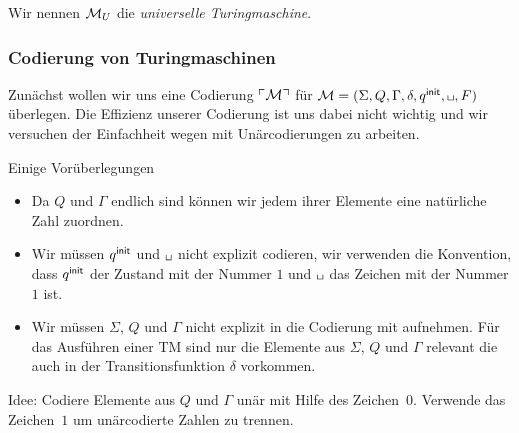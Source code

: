 Wir nennen $\mathcal{M}_U$ die \emph{universelle Turingmaschine}.

\subsubsection{Codierung von Turingmaschinen}

Zunächst wollen wir uns eine Codierung $\ulcorner \mathcal{M} \urcorner$ für $\mathcal{\M}=(\Sigma, Q, \Gamma, \delta, \qinit, \blank, F)$ überlegen.
Die Effizienz unserer Codierung ist uns dabei nicht wichtig und wir versuchen der Einfachheit wegen mit Unärcodierungen zu arbeiten.

Einige Vorüberlegungen
\begin{itemize}
 \item Da $Q$ und $\Gamma$ endlich sind können wir jedem ihrer Elemente eine natürliche Zahl zuordnen.
 \item Wir müssen $q^\mathsf{init}$ und $\blank$ nicht explizit codieren, wir verwenden die Konvention, 
 dass $q^\mathsf{init}$ der Zustand mit der Nummer $1$ und $\blank$ das Zeichen mit der Nummer $1$ ist.
 \item Wir müssen $\Sigma$, $Q$ und $\Gamma$ nicht explizit in die Codierung mit aufnehmen.
 Für das Ausführen einer \ac{TM} sind nur die Elemente aus $\Sigma$, $Q$ und $\Gamma$ relevant die auch in der Transitionsfunktion $\delta$ vorkommen.
\end{itemize}

Idee: Codiere Elemente aus $Q$ und $\Gamma$ unär mit Hilfe des Zeichen~$0$.
Verwende das Zeichen~$1$ um unärcodierte Zahlen zu trennen.

